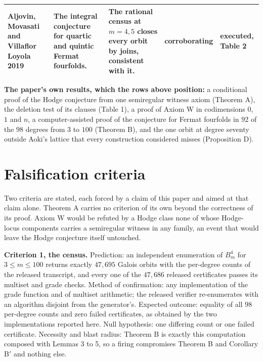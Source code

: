 \documentclass[10pt,twocolumn]{article}
\begin{document}
\begin{table}[t]
\begin{tabular}{@{}p{}p{}p{}p{}p{}@{}}
Aljovin, Movasati and Villaflor Loyola 2019 & The integral conjecture for quartic and quintic Fermat fourfolds. & The rational census at $m=4,5$ closes every orbit by joins, consistent with it. & corroborating & executed, Table 2 \\
\bottomrule
\end{tabular}
\par\smallskip
\begin{minipage}{0.94\textwidth}\scriptsize \textbf{The paper's own results, which the rows above position:} a conditional proof of the Hodge conjecture from one semiregular witness axiom (Theorem A), the deletion test of its clauses (Table 1), a proof of Axiom W in codimensions $0$, $1$ and $n$, a computer-assisted proof of the conjecture for Fermat fourfolds in $92$ of the $98$ degrees from $3$ to $100$ (Theorem B), and the one orbit at degree seventy outside Aoki's lattice that every construction considered misses (Proposition D).\end{minipage}
\end{table}

\hypertarget{falsification-criteria}{%
\section{Falsification criteria}\label{falsification-criteria}}

Two criteria are stated, each forced by a claim of this paper and aimed
at that claim alone. Theorem A carries no criterion of its own beyond
the correctness of its proof. Axiom W would be refuted by a Hodge class
none of whose Hodge-locus components carries a semiregular witness in
any family, an event that would leave the Hodge conjecture itself
untouched.

\textbf{Criterion 1, the census.} Prediction: an independent enumeration
of \(B^4_m\) for \(3\le m\le 100\) returns exactly \(47{,}695\) Galois
orbits with the per-degree counts of the released transcript, and every
one of the \(47{,}686\) released certificates passes its multiset and
grade checks. Method of confirmation: any implementation of the grade
function and of multiset arithmetic; the released verifier re-enumerates
with an algorithm disjoint from the generator's. Expected outcome:
equality of all \(98\) per-degree counts and zero failed certificates,
as obtained by the two implementations reported here. Null hypothesis:
one differing count or one failed certificate. Necessity and blast
radius: Theorem B is exactly this computation composed with Lemmas 3 to
5, so a firing compromises Theorem B and Corollary B\('\) and nothing
else.
\end{document}
